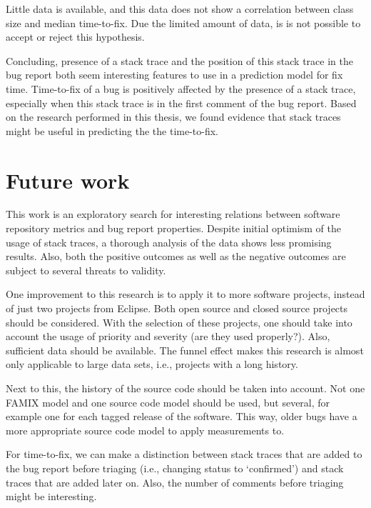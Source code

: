 \vspace{\baselineskip}
\hypbc{}
\vspace{\baselineskip}

\noindent
Little data is available, and this data does not show a correlation between class size and median time-to-fix. Due the limited amount of data, is is not possible to accept or reject this hypothesis.

Concluding, presence of a stack trace and the position of this stack trace in the bug report both seem interesting features to use in a prediction model for fix time. Time-to-fix of a bug is positively affected by the presence of a stack trace, especially when this stack trace is in the first comment of the bug report. Based on the research performed in this thesis, we found evidence that stack traces might be useful in predicting the the time-to-fix.


\section{Future work} %
\label{sec:future_work}
This work is an exploratory search for interesting relations between software repository metrics and bug report properties. Despite initial optimism of the usage of stack traces, a thorough analysis of the data shows less promising results. Also, both the positive outcomes as well as the negative outcomes are subject to several threats to validity. 

One improvement to this research is to apply it to more software projects, instead of just two projects from Eclipse. Both open source and closed source projects should be considered. With the selection of these projects, one should take into account the usage of priority and severity (are they used properly?). Also, sufficient data should be available. The funnel effect makes this research is almost only applicable to large data sets, i.e., projects with a long history.

Next to this, the history of the source code should be taken into account. Not one FAMIX model and one source code model should be used, but several, for example one for each tagged release of the software. This way, older bugs have a more appropriate source code model to apply measurements to.

For time-to-fix, we can make a distinction between stack traces that are added to the bug report before triaging (i.e., changing status to `confirmed') and stack traces that are added later on. Also, the number of comments before triaging might be interesting.

